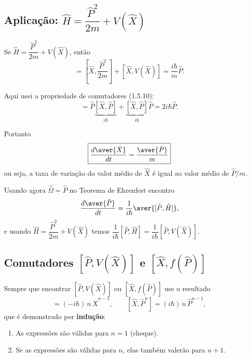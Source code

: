 \subsection*{Aplicação: $\hat{H} = \dfrac{\hat{P}^2}{2m} + V(\hat{X})$}

Se $\hat{H} = \dfrac{\hat{P}^2}{2m} + V(\hat{X})$, então
\begin{equation}
    [\hat{X}, \hat{H}] = \left[\hat{X}, \frac{\hat{P}^2}{2m}\right] + [\hat{X}, V(\hat{X})] = \frac{i\hbar}{m}\hat{P}.
\label{eq:aula15_comutador_X_H}
\end{equation}

Aqui usei a propriedade de comutadores (1.5.10):
\begin{equation}
    [\hat{X}, \hat{P}^2] = \hat{P}\underbrace{[\hat{X}, \hat{P}]}_{i\hbar} + \underbrace{[\hat{X}, \hat{P}]}_{i\hbar}\hat{P} = 2i\hbar\hat{P}.
\label{eq:aula15_comutador_X_P2}
\end{equation}

Portanto
\begin{equation}
    \boxed{\frac{d\aver{\hat{X}}}{dt} = \frac{\aver{\hat{P}}}{m}}
\label{eq:aula15_dX_dt_resultado}
\end{equation}
ou seja, a taxa de variação do valor médio de $\hat{X}$ é igual ao valor médio de $\hat{P}/m$.

Usando agora $\hat{\Omega} = \hat{P}$ no Teorema de Ehrenfest encontro
\begin{equation}
    \frac{d\aver{\hat{P}}}{dt} = \frac{1}{i\hbar}\aver{[\hat{P}, \hat{H}]},
\label{eq:aula15_dP_ehrenfest}
\end{equation}
e usando $\hat{H} = \dfrac{\hat{P}^2}{2m} + V(\hat{X})$ temos $\dfrac{1}{i\hbar}[\hat{P}, \hat{H}] = \dfrac{1}{i\hbar}[\hat{P}, V(\hat{X})]$.

\subsection*{Comutadores $[\hat{P}, V(\hat{X})]$ e $[\hat{X}, f(\hat{P})]$}

Sempre que encontrar $[\hat{P}, V(\hat{X})]$ ou $[\hat{X}, f(\hat{P})]$ use o resultado
\begin{equation}
    [\hat{P}, \hat{X}^n] = (-i\hbar)\, n\, \hat{X}^{n-1}, \qquad [\hat{X}, \hat{P}^n] = (i\hbar)\, n\, \hat{P}^{n-1},
\label{eq:aula15_comutadores_potencias}
\end{equation}
que é demonstrado por \textbf{indução}:
\begin{enumerate}
    \item[(i)] As expressões são válidas para $n = 1$ (cheque).
    \item[(ii)] Se as expressões são válidas para $n$, elas também valerão para $n+1$.
\end{enumerate}

